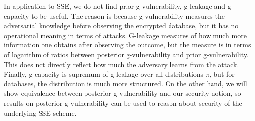 In application to SSE, we do not find prior g-vulnerability, g-leakage and g-capacity to be useful. The reason is because g-vulnerability measures the adversarial knowledge before observing the encrypted database, but it has no operational meaning in terms of attacks. G-leakage measures of how much more information one obtains after observing the outcome, but the measure is in terms of logarithm of ratios between posterior g-vulnerability and prior g-vulnerability. This does not directly reflect how much the adversary learns from the attack. Finally, g-capacity is supremum of g-leakage over all distributions $\pi$, but for databases, the distribution is much more structured. On the other hand, we will show equivalence between posterior g-vulnerability and our security notion, so results on posterior g-vulnerability can be used to reason about security of the underlying SSE scheme.
